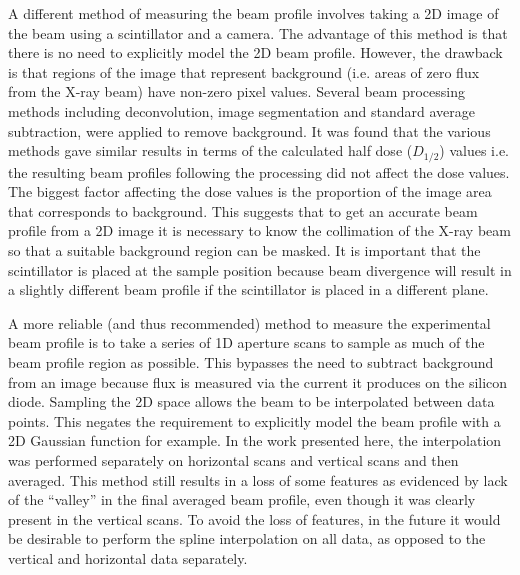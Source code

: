 A different method of measuring the beam profile involves taking a 2D image of the beam using a scintillator and a camera.
The advantage of this method is that there is no need to explicitly model the 2D beam profile.
However, the drawback is that regions of the image that represent background (i.e. areas of zero flux from the X-ray beam) have non-zero pixel values.
Several beam processing methods including deconvolution, image segmentation and standard average subtraction, were applied to remove background.
It was found that the various methods gave similar results in terms of the calculated half dose ($D_{1/2}$) values i.e. the resulting beam profiles following the processing did not affect the dose values.
The biggest factor affecting the dose values is the proportion of the image area that corresponds to background.
This suggests that to get an accurate beam profile from a 2D image it is necessary to know the collimation of the X-ray beam so that a suitable background region can be masked.
It is important that the scintillator is placed at the sample position because beam divergence will result in a slightly different beam profile if the scintillator is placed in a different plane.

A more reliable (and thus recommended) method to measure the experimental beam profile is to take a series of 1D aperture scans to sample as much of the beam profile region as possible.
This bypasses the need to subtract background from an image because flux is measured via the current it produces on the silicon diode.
Sampling the 2D space allows the beam to be interpolated between data points.
This negates the requirement to explicitly model the beam profile with a 2D Gaussian function for example.
In the work presented here, the interpolation was performed separately on horizontal scans and vertical scans and then averaged.
This method still results in a loss of some features as evidenced by lack of the ``valley'' in the final averaged beam profile, even though it was clearly present in the vertical scans.
To avoid the loss of features, in the future it would be desirable to perform the spline interpolation on all data, as opposed to the vertical and horizontal data separately.
